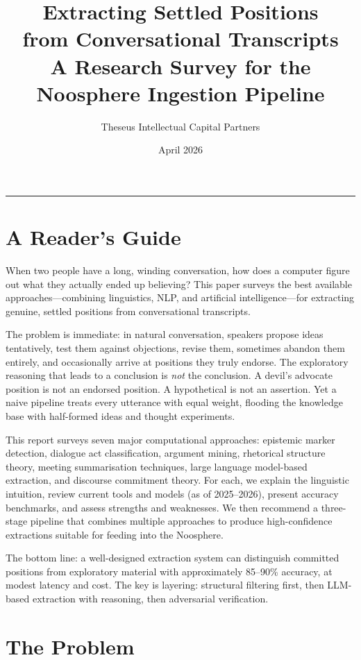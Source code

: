 \documentclass[11pt,letterpaper]{article}
\title{
  \textbf{Extracting Settled Positions}\\
  \textbf{from Conversational Transcripts}\\[0.3em]
  {\large A Research Survey for the Noosphere Ingestion Pipeline}
}
\author{Theseus Intellectual Capital Partners}
\date{April 2026}
\begin{document}
\maketitle

\begin{center}
  \rule{0.5\linewidth}{0.4pt}
\end{center}

\section*{A Reader's Guide}

When two people have a long, winding conversation, how does a computer figure out what they actually ended up believing? This paper surveys the best available approaches—combining linguistics, NLP, and artificial intelligence—for extracting genuine, settled positions from conversational transcripts.

The problem is immediate: in natural conversation, speakers propose ideas tentatively, test them against objections, revise them, sometimes abandon them entirely, and occasionally arrive at positions they truly endorse. The exploratory reasoning that leads to a conclusion is \textit{not} the conclusion. A devil's advocate position is not an endorsed position. A hypothetical is not an assertion. Yet a naive pipeline treats every utterance with equal weight, flooding the knowledge base with half-formed ideas and thought experiments.

This report surveys seven major computational approaches: epistemic marker detection, dialogue act classification, argument mining, rhetorical structure theory, meeting summarisation techniques, large language model-based extraction, and discourse commitment theory. For each, we explain the linguistic intuition, review current tools and models (as of 2025–2026), present accuracy benchmarks, and assess strengths and weaknesses. We then recommend a three-stage pipeline that combines multiple approaches to produce high-confidence extractions suitable for feeding into the Noosphere.

The bottom line: a well-designed extraction system can distinguish committed positions from exploratory material with approximately 85–90\% accuracy, at modest latency and cost. The key is layering: structural filtering first, then LLM-based extraction with reasoning, then adversarial verification.

\section{The Problem}
\end{document}
